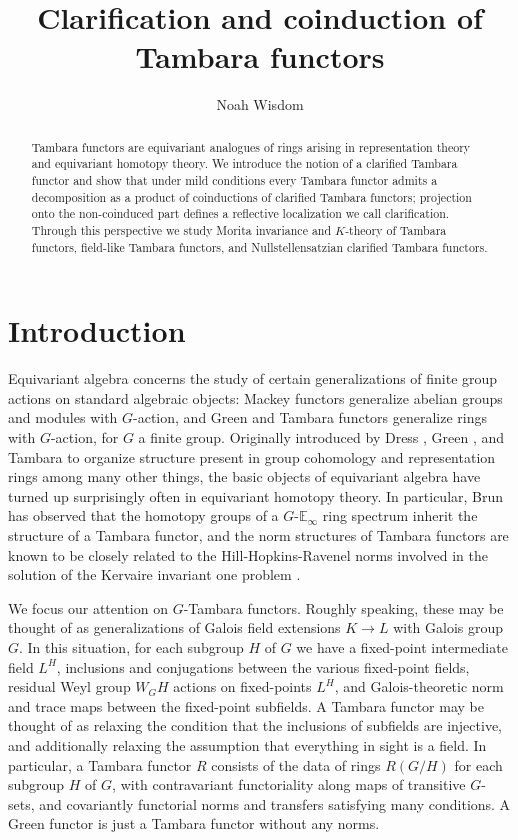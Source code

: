 \documentclass[11pt,dvipsnames]{amsart}
\title{Clarification and coinduction of Tambara functors}
\author{Noah Wisdom}
\date{}
\theoremstyle{BoldRemark}
\begin{document}
\begin{abstract}
    Tambara functors are equivariant analogues of rings arising in representation theory and equivariant homotopy theory. We introduce the notion of a clarified Tambara functor and show that under mild conditions every Tambara functor admits a decomposition as a product of coinductions of clarified Tambara functors; projection onto the non-coinduced part defines a reflective localization we call clarification. Through this perspective we study Morita invariance and $K$-theory of Tambara functors, field-like Tambara functors, and Nullstellensatzian clarified Tambara functors. 
\end{abstract}

\maketitle
\tableofcontents

\section{Introduction}

Equivariant algebra concerns the study of certain generalizations of finite group actions on standard algebraic objects: Mackey functors generalize abelian groups and modules with $G$-action, and Green and Tambara functors generalize rings with $G$-action, for $G$ a finite group. Originally introduced by Dress \cite{Dre71}, Green \cite{Gre71}, and Tambara \cite{Tam93} to organize structure present in group cohomology and representation rings among many other things, the basic objects of equivariant algebra have turned up surprisingly often in equivariant homotopy theory. In particular, Brun has observed \cite{Bru05} that the homotopy groups of a $G$-$\mathbb{E}_\infty$ ring spectrum inherit the structure of a Tambara functor, and the norm structures of Tambara functors are known to be closely related to the Hill-Hopkins-Ravenel norms involved in the solution of the Kervaire invariant one problem \cite{HHR}. 

We focus our attention on $G$-Tambara functors. Roughly speaking, these may be thought of as generalizations of Galois field extensions $K \rightarrow L$ with Galois group $G$. In this situation, for each subgroup $H$ of $G$ we have a fixed-point intermediate field $L^H$, inclusions and conjugations between the various fixed-point fields, residual Weyl group $W_G H$ actions on fixed-points $L^H$, and Galois-theoretic norm and trace maps between the fixed-point subfields. A Tambara functor may be thought of as relaxing the condition that the inclusions of subfields are injective, and additionally relaxing the assumption that everything in sight is a field. In particular, a Tambara functor $R$ consists of the data of rings $R(G/H)$ for each subgroup $H$ of $G$, with contravariant functoriality along maps of transitive $G$-sets, and covariantly functorial norms and transfers satisfying many conditions. A Green functor is just a Tambara functor without any norms.
\end{document}
